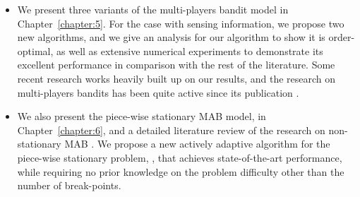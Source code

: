 \begin{itemize}

    \item
    We present three variants of the multi-players bandit model in Chapter~\ref{chapter:5}.
    For the case with sensing information, we propose two new algorithms, and we give an analysis for our algorithm \MCTopM{} to show it is order-optimal,
    as well as extensive numerical experiments to demonstrate its excellent performance in comparison with the rest of the literature.
    Some recent research works heavily built up on our results, and the research on multi-players bandits has been quite active since its publication \cite{Besson2018ALT}.


    \item
    We also present the piece-wise stationary MAB model, in Chapter~\ref{chapter:6}, and a detailed literature review of the research on non-stationary MAB \cite{Besson2019GLRT,Besson2019Gretsi}.
    We propose a new actively adaptive algorithm for the piece-wise stationary problem, \GLRklUCB, that achieves state-of-the-art performance, while requiring no prior knowledge on the problem difficulty other than the number of break-points.

\end{itemize}


